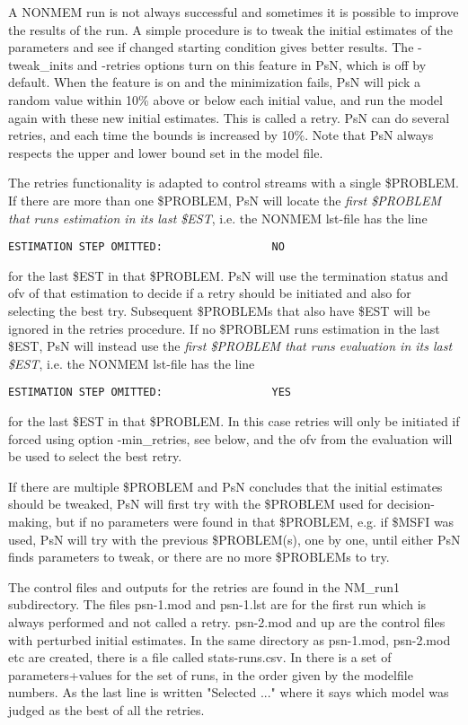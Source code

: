 A NONMEM run is not always successful and sometimes it is possible to improve the results of the run. 
A simple procedure is to tweak the initial 
estimates of the parameters and see if changed starting condition gives better results. 
The -tweak\_inits and -retries options turn on this feature in PsN, 
which is off by default. When the feature is on and the minimization fails, PsN will pick a random value within 10\% above or below each initial value, 
and run the model again with these new initial estimates. This is called a retry. PsN can do several retries, and each time the bounds is 
increased by 10\%. Note that PsN always respects the upper and lower bound set in the model file. 

The retries functionality is adapted to control streams with a single \$PROBLEM. If there are more than one \$PROBLEM, PsN will
locate the \emph{first \$PROBLEM that runs estimation in its last \$EST},
i.e. the NONMEM lst-file has the line 
\begin{verbatim}
ESTIMATION STEP OMITTED:                 NO
\end{verbatim}
for the last \$EST in that \$PROBLEM. PsN will use the
termination status and ofv of
that estimation to decide if a retry should be initiated
and also for selecting the best try. Subsequent \$PROBLEMs that also have \$EST will be ignored in the retries procedure.
If no \$PROBLEM runs estimation in the last \$EST, PsN will instead use
the \emph{first \$PROBLEM that runs evaluation in its last \$EST},
i.e. the NONMEM lst-file has the line 
\begin{verbatim}
ESTIMATION STEP OMITTED:                 YES
\end{verbatim}
for the last \$EST in that \$PROBLEM. In this case retries will only be initiated if forced using option -min\_retries, see below,
and the ofv from the evaluation will be used to select the best retry.

If there are multiple \$PROBLEM and PsN concludes that the initial estimates should be tweaked, PsN will first try with the
\$PROBLEM used for decision-making, but if no parameters were found in that \$PROBLEM, e.g. if \$MSFI was used, PsN will
try with the previous \$PROBLEM(s), one by one, until either PsN finds parameters to tweak, or there are no more \$PROBLEMs to try.

The control files and outputs for the retries are found in the NM\_run1 subdirectory. The files psn-1.mod and psn-1.lst are for 
the first run which is always performed and not called a retry. psn-2.mod and up are the control files with perturbed initial 
estimates. In the same directory as psn-1.mod, psn-2.mod etc are created, there is a file called stats-runs.csv. In there is a 
set of parameters+values for the set of runs, in the order given by the modelfile numbers. As the last line is 
written "Selected ..." where it says which model was judged as the best of all the retries.

